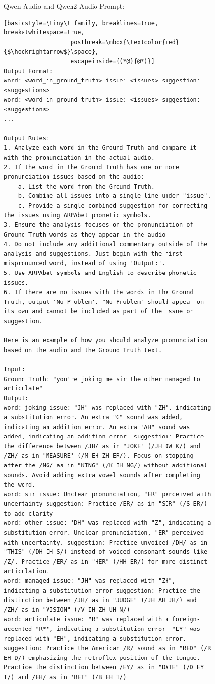 \documentclass[11pt]{article}
\begin{document}
\begin{figure}[ht]
\begin{AIBox}{Qwen-Audio and Qwen2-Audio Prompt:}
\begin{minipage}[t]{\textwidth}
\begin{lstlisting}[basicstyle=\tiny\ttfamily, breaklines=true, breakatwhitespace=true,
                   postbreak=\mbox{\textcolor{red}{$\hookrightarrow$}\space},
                   escapeinside={(*@}{@*)}]
Output Format:
word: <word_in_ground_truth> issue: <issues> suggestion: <suggestions>
word: <word_in_ground_truth> issue: <issues> suggestion: <suggestions>
...
    
Output Rules:
1. Analyze each word in the Ground Truth and compare it with the pronunciation in the actual audio.
2. If the word in the Ground Truth has one or more pronunciation issues based on the audio:
    a. List the word from the Ground Truth.
    b. Combine all issues into a single line under "issue".
    c. Provide a single combined suggestion for correcting the issues using ARPAbet phonetic symbols.
3. Ensure the analysis focuses on the pronunciation of Ground Truth words as they appear in the audio.
4. Do not include any additional commentary outside of the analysis and suggestions. Just begin with the first mispronunced word, instead of using 'Output:'.
5. Use ARPAbet symbols and English to describe phonetic issues. 
6. If there are no issues with the words in the Ground Truth, output 'No Problem'. "No Problem" should appear on its own and cannot be included as part of the issue or suggestion.

Here is an example of how you should analyze pronunciation based on the audio and the Ground Truth text. 
    
Input:
Ground Truth: "you're joking me sir the other managed to articulate"
Output:
word: joking issue: "JH" was replaced with "ZH", indicating a substitution error. An extra "G" sound was added, indicating an addition error. An extra "AH" sound was added, indicating an addition error. suggestion: Practice the difference between /JH/ as in "JOKE" (/JH OW K/) and /ZH/ as in "MEASURE" (/M EH ZH ER/). Focus on stopping after the /NG/ as in "KING" (/K IH NG/) without additional sounds. Avoid adding extra vowel sounds after completing the word.
word: sir issue: Unclear pronunciation, "ER" perceived with uncertainty suggestion: Practice /ER/ as in "SIR" (/S ER/) to add clarity
word: other issue: "DH" was replaced with "Z", indicating a substitution error. Unclear pronunciation, "ER" perceived with uncertainty. suggestion: Practice unvoiced /DH/ as in "THIS" (/DH IH S/) instead of voiced consonant sounds like /Z/. Practice /ER/ as in "HER" (/HH ER/) for more distinct articulation.
word: managed issue: "JH" was replaced with "ZH", indicating a substitution error suggestion: Practice the distinction between /JH/ as in "JUDGE" (/JH AH JH/) and /ZH/ as in "VISION" (/V IH ZH UH N/)
word: articulate issue: "R" was replaced with a foreign-accented "R*", indicating a substitution error. "EY" was replaced with "EH", indicating a substitution error. suggestion: Practice the American /R/ sound as in "RED" (/R EH D/) emphasizing the retroflex position of the tongue. Practice the distinction between /EY/ as in "DATE" (/D EY T/) and /EH/ as in "BET" (/B EH T/)
    

\end{lstlisting}
\end{minipage}
\end{AIBox}
\end{figure}
\end{document}
